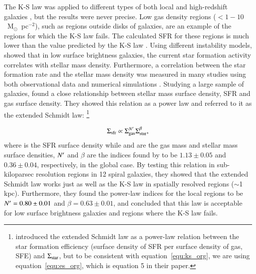 The K-S law was applied to different types of both local and high-redshift galaxies \citep[e.g.][]{Boissier07,Kennicutt07, Bigiel08, Freundlich13}, but the results were never precise. Low gas density regions ($ < 1-10$~M$_{\odot}$~pc$^{-2}$), such as regions outside disks of galaxies, are an example of the regions for which the K-S law fails. The calculated SFR for these regions is much lower than the value predicted by the K-S law \citep[e.g.][]{Martin01, Bigiel08}. Using different instability models, \citet{Hunter98} showed that in low surface brightness galaxies, the current star formation activity correlates with stellar mass density. Furthermore, a correlation between the star formation rate and the stellar mass density was measured in many studies using both observational data and numerical simulations \citep[e.g.][]{Hunter04,Leroy08,Krumholz09,Shi11,Kim11,Kim13}. 
Studying a large sample of galaxies, \citet{Shi11} found a close relationship between stellar mass surface density, SFR and gas surface density.  They showed this relation as a power law and referred to it as the extended Schmidt law:
\footnote{\citet{Shi11} introduced the extended Schmidt law as a power-law relation between the star formation efficiency (surface density of SFR per surface density of gas, SFE) and $\Sigma_{\mathrm {star }}$, but to be consistent with equation~\ref{equ:ks_org}, we are using equation~\ref{equ:es_org}, which is equation 5 in their paper.} 

\begin{equation}
\label{equ:es_org}
\Sigma_{\mathrm{sfr }} \propto \Sigma_{\mathrm {gas }}^{N^\prime} \Sigma_{\mathrm {star }}^{\beta},
\end{equation}
\noindent where \sigmasfr is the SFR surface density while \sigmagas and \sigmastar are the gas mass and stellar mass surface densities,  $N^\prime$ and $\beta$ are the indices found by \citet{Shi11} to be $1.13 \pm 0.05$ and $0.36\pm0.04$, respectively, in the global case. By testing this relation in sub-kiloparsec resolution regions in 12 spiral galaxies, they showed that the extended Schmidt law works just as well as the K-S law in spatially resolved regions ($\sim$1 kpc). Furthermore, they found the power-law indices for the local regions to be $N^\prime = 0.80 \pm 0.01$ and $\beta = 0.63\pm0.01$, and concluded that this law is acceptable for low surface brightness galaxies and regions where the K-S law fails.


